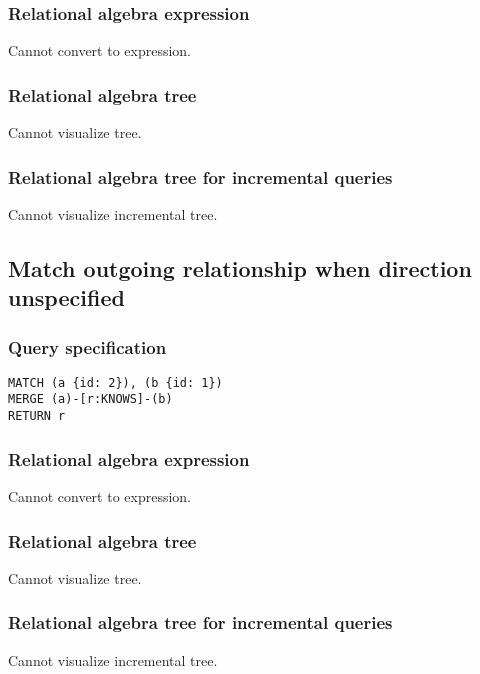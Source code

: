 \subsubsection*{Relational algebra expression}

Cannot convert to expression.

\subsubsection*{Relational algebra tree}

Cannot visualize tree.

\subsubsection*{Relational algebra tree for incremental queries}

Cannot visualize incremental tree.

\subsection{Match outgoing relationship when direction unspecified}

\subsubsection*{Query specification}

\begin{lstlisting}
MATCH (a {id: 2}), (b {id: 1})
MERGE (a)-[r:KNOWS]-(b)
RETURN r
\end{lstlisting}

\subsubsection*{Relational algebra expression}

Cannot convert to expression.

\subsubsection*{Relational algebra tree}

Cannot visualize tree.

\subsubsection*{Relational algebra tree for incremental queries}

Cannot visualize incremental tree.

